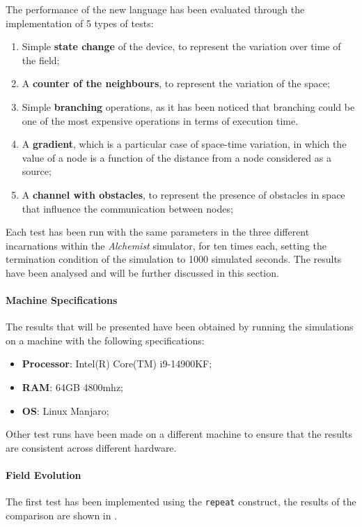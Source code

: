The performance of the new language has been evaluated through the implementation of 5 types of tests:
\begin{enumerate}
    \item Simple \textbf{state change} of the device, to represent the variation over time of the field;
    \item A \textbf{counter of the neighbours}, to represent the variation of the space;
    \item Simple \textbf{branching} operations, as it has been noticed that branching could be one of the most expensive operations in terms of execution time.
    \item A \textbf{gradient}, which is a particular case of space-time variation, in which the value of a node is a
        function of the distance from a node considered as a source;
    \item A \textbf{channel with obstacles}, to represent the presence of obstacles in space that influence the communication between nodes;
\end{enumerate}

Each test has been run with the same parameters in the three different incarnations within the \emph{Alchemist} simulator,
for ten times each, setting the termination condition of the simulation to 1000 simulated seconds.
The results have been analysed and will be further discussed in this section.

\paragraph{Machine Specifications}
The results that will be presented have been obtained by running the simulations on a machine with the following specifications:
\begin{itemize}
    \item \textbf{Processor}: Intel(R) Core(TM) i9-14900KF;
    \item \textbf{RAM}: 64GB 4800mhz;
    \item \textbf{OS}: Linux Manjaro;
\end{itemize}

Other test runs have been made on a different machine to ensure that the results are consistent across different hardware.

\paragraph{Field Evolution}
The first test has been implemented using the \texttt{repeat} construct, the results of the comparison are shown in .

